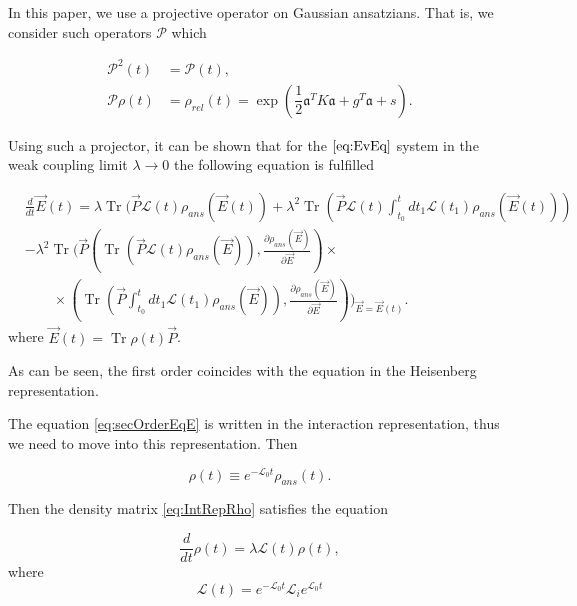 \documentclass[12pt]{article}
\theoremstyle{definition}
\newcommand\Tr{\operatorname{Tr}}
\def\la {\lambda}
\begin{document}
	
	
	
	In this paper, we use a projective operator on Gaussian ansatzians. That is, we consider such operators $\mathcal{P}$ which
	
	\begin{align*}
		\mathcal{P}^2(t)& = \mathcal{P}(t), \\
		\mathcal{P}\rho(t)& = \rho_{rel}(t) = \exp(\dfrac{1}{2}\mathfrak{a}^TK\mathfrak{a} + g^T\mathfrak{a} + s).
	\end{align*}
	
	Using such a projector, it can be shown that for the $\ref{eq:EvEq}$ system in the weak coupling limit $\la \rightarrow 0$ the following equation is fulfilled
	
	\begin{align}
		&\frac{d}{dt} \vec{E}(t) = \lambda   \Tr ( \vec{P}\mathcal{L}(t)\rho_{ans} (\vec{E}(t) ) + \lambda^2 \Tr \left( \vec{P} \mathcal{L}(t)  \int_{t_0}^t dt_1 \mathcal{L}(t_1)\rho_{ans} (\vec{E}(t))   \right) \nonumber \\
		& 	-  \lambda^2 \Tr\Biggl( \vec{P} \left(\Tr (  \vec{P} \mathcal{L}(t)\rho_{ans} (\vec{E}) ) , \frac{\partial \rho_{ans}(\vec{E})}{\partial \vec{E}} \right) \times \nonumber\\
		& \qquad \times \left(\Tr (  \vec{P}\int_{t_0}^t dt_1\mathcal{L}(t_1)\rho_{ans} (\vec{E}) )  , \frac{\partial \rho_{ans}(\vec{E})}{\partial \vec{E}} \right) \Biggr)_{\vec{E} =\vec{E}(t) }. \label{eq:secOrderEqE}
	\end{align}
	where $\vec{E}(t) = \Tr\rho(t)\vec{P}$.
	
	As can be seen, the first order coincides with the equation in the Heisenberg representation.
	
	The equation \ref{eq:secOrderEqE} is written in the interaction representation, thus we need to move into this representation. Then
	
	\begin{equation}
		\label{eq:IntRepRho}
		\rho(t) \equiv e^{-\mathcal{L}_0t}\rho_{ans}(t).
	\end{equation}
	
	Then the density matrix \ref{eq:IntRepRho} satisfies the equation 
	
	\begin{equation}
		\label{eq:MainEq}
		\dfrac{d}{dt}\rho(t) = \la\mathcal{L}(t)\rho(t),
	\end{equation}
	where
	\begin{equation}
		\label{eq:IntRepL}
		\mathcal{L}(t) = e^{-\mathcal{L}_0t}\mathcal{L}_ie^{\mathcal{L}_0t}
	\end{equation}
	
\end{document}
